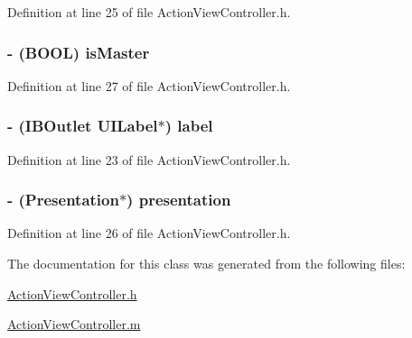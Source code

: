 Definition at line 25 of file ActionViewController.h.

\hypertarget{interface_action_view_controller_abbe31ad947ac06e484e486dd2d47c541}{
\subsubsection[{isMaster}]{\setlength{\rightskip}{0pt plus 5cm}-\/ (BOOL) isMaster}}
\label{interface_action_view_controller_abbe31ad947ac06e484e486dd2d47c541}


Definition at line 27 of file ActionViewController.h.

\hypertarget{interface_action_view_controller_a729dc1b9adc6098142f097c005a990ba}{
\subsubsection[{label}]{\setlength{\rightskip}{0pt plus 5cm}-\/ (IBOutlet UILabel$\ast$) label}}
\label{interface_action_view_controller_a729dc1b9adc6098142f097c005a990ba}


Definition at line 23 of file ActionViewController.h.

\hypertarget{interface_action_view_controller_a4687fd0668ba32c76160e4d4f1747c12}{
\subsubsection[{presentation}]{\setlength{\rightskip}{0pt plus 5cm}-\/ ({\bf Presentation}$\ast$) presentation}}
\label{interface_action_view_controller_a4687fd0668ba32c76160e4d4f1747c12}


Definition at line 26 of file ActionViewController.h.



The documentation for this class was generated from the following files:\begin{DoxyCompactItemize}
\item 
\hyperlink{_action_view_controller_8h}{ActionViewController.h}\item 
\hyperlink{_action_view_controller_8m}{ActionViewController.m}\end{DoxyCompactItemize}
